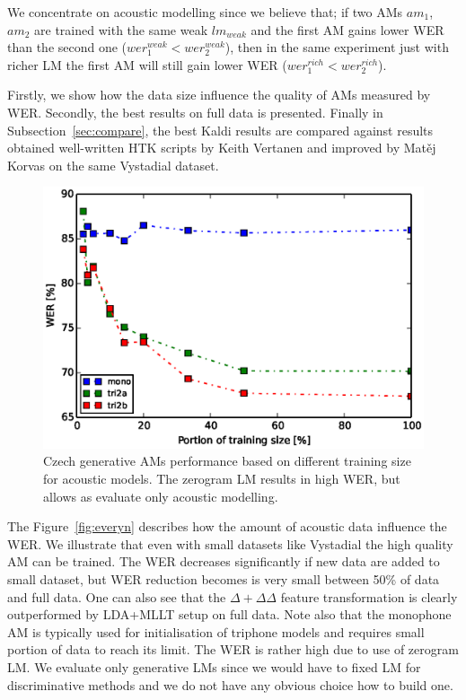 We concentrate on acoustic modelling since we believe that; if two \acp{AM} $am_1$, $am_2$ are trained with the same weak $lm_{weak}$ and the first \ac{AM} gains lower \ac{WER} than the second one ($wer^{weak}_{1} <  wer^{weak}_{2}$), then in the same experiment just with richer \ac{LM} the first \ac{AM} will still gain lower \ac{WER} ($wer^{rich}_{1} <  wer^{rich}_{2}$).

Firstly, we show how the data size influence the quality of \acp{AM} measured by \ac{WER}.
Secondly,  the best results on full data is presented.
Finally in Subsection~\ref{sec:compare}, the best Kaldi results are compared against results obtained well-written \ac{HTK} scripts by Keith Vertanen and improved by Matěj Korvas \cite{korvas_2014} on the same Vystadial dataset.

\begin{figure}[!htp]
    \begin{center}
    \includegraphics[scale=0.7]{images/partial-zerogram.ps}
    \caption{Czech generative \acp{AM} performance based on different training size for acoustic models. The zerogram LM results in high WER, but allows as evaluate only acoustic modelling.}
    \label{fig:partials} 
    \end{center}
\end{figure}

The Figure~\ref{fig:everyn} describes how the amount of acoustic data influence the \ac{WER}.
We illustrate that even with small datasets like Vystadial the high quality \ac{AM} can be trained.
The WER decreases significantly if new data are added to small dataset, but \ac{WER} reduction becomes is very small between 50\% of data and full data.
One can also see that the $\Delta+\Delta\Delta$ feature transformation is clearly outperformed by \ac{LDA}+\ac{MLLT} setup on full data.
Note also that the monophone \ac{AM} is typically used for initialisation of triphone models and requires small portion of data to reach its limit.
The WER is rather high due to use of zerogram \ac{LM}.
We evaluate only generative \acp{LM} since we would have to fixed LM for discriminative methods and we do not have any obvious choice how to build one.

